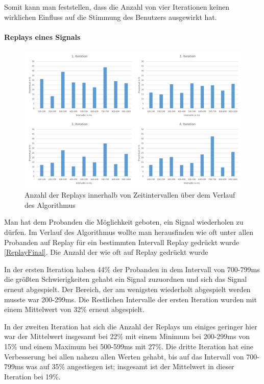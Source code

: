 Somit kann man feststellen, dass die Anzahl von vier Iterationen keinen wirklichen Einfluss auf die Stimmung des Benutzers ausgewirkt hat.


\paragraph{Replays eines Signals}

\begin{figure}[htbp] 
            \centering
   	\includegraphics[width=\textwidth]{pics/analyse/algo/Replay/ReplayFinal2.png}
	\caption{Anzahl der Replays innerhalb von Zeitintervallen {\"u}ber dem Verlauf des Algorithmus}
	\label{fig:ReplayFinal}
\end{figure}

Man hat dem Probanden die M{\"o}glichkeit geboten, ein Signal wiederholen zu d{\"u}rfen. Im Verlauf des Algorithmus wollte man herausfinden wie oft unter allen Probanden auf Replay f{\"u}r ein bestimmten Intervall Replay gedr{\"u}ckt wurde \autoref{ReplayFinal}. Die Anzahl der wie oft auf Replay gedr{\"u}ckt wurde 

In der ersten Iteration haben 44\% der Probanden in dem Intervall von 700-799ms die gr{\"o}{\ss}ten Schwierigkeiten gehabt ein Signal zuzuordnen und sich das Signal erneut abgespielt. Der Bereich, der am wenigsten wiederholt abgespielt werden musste war 200-299ms. Die Restlichen Intervalle der ersten Iteration wurden mit einem Mittelwert von 32\% erneut abgespielt.

In der zweiten Iteration hat sich die Anzahl der Replays um einiges geringer hier war der Mittelwert insgesamt bei 22\% mit einem Minimum bei 200-299ms von 15\% und einem Maximum bei 500-599ms mit 27\%.  Die dritte Iteration hat eine Verbesserung bei allen nahezu allen Werten gehabt, bis auf das Intervall von 700-799ms was auf 35\% angestiegen ist; insgesamt ist der Mittelwert in dieser Iteration bei 19\%. 

